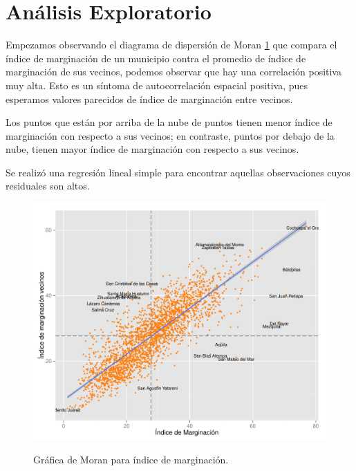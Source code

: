 \section{Análisis Exploratorio}


Empezamos observando el diagrama de dispersión  de Moran \ref{obj:moranplot} que compara el índice de marginación de un municipio contra el promedio de índice de marginación de sus vecinos, podemos observar que hay una correlación positiva muy alta. Esto es un síntoma de autocorrelación espacial positiva, pues esperamos valores parecidos de índice de marginación entre vecinos. 

Los puntos que están por arriba de la nube de puntos tienen menor índice de marginación con respecto a sus vecinos; en contraste, puntos por debajo de la nube, tienen mayor índice de marginación con respecto a sus vecinos.

Se realizó una regresión lineal simple para encontrar aquellas observaciones cuyos residuales son altos. 

\begin{figure}[!ht]
\centering
\includegraphics[width=.95\textwidth]{./plots/moran_plot.pdf} \\
\caption{Gráfica de Moran para índice de marginación.}
\label{obj:moranplot}  
\end{figure}

